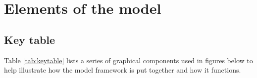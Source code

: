 \section{Elements of the model \label{sec:elementsmodelFramework}}

\subsection{Key table \label{sec:keytable}}

Table \ref{tab:keytable} lists a series of graphical components used in figures below to help illustrate how the model framework is put together and how it functions.

\renewcommand{\arraystretch}{1.2}
\begin{table}[!hbt]
\begin{center}


\end{center}
\end{table}
